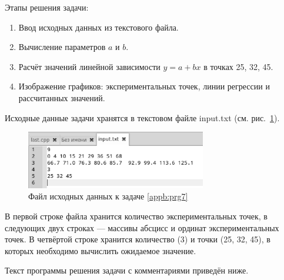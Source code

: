 Этапы решения задачи:

\begin{enumerate}
\item Ввод исходных данных из текстового файла.
\item Вычисление параметров $a$ и $b$.
\item Расчёт значений линейной зависимости  $y=a+bx$ в точках  25, 32, 45.
\item Изображение графиков: экспериментальных точек, линии регрессии и рассчитанных значений.
\end{enumerate}

Исходные данные задачи хранятся в текстовом файле input.txt (см. рис.~\ref{appb:refDrawing8}).

\begin{figure}[htb]
\begin{center}
\includegraphics[width=0.7\textwidth]{img/ris_appb_10}
\caption{Файл исходных данных к задаче \ref{appb:prg7}}
\label{appb:refDrawing8}
\end{center}
\end{figure}

В первой строке файла хранится количество экспериментальных точек, в следующих двух 
строках --- массивы абсцисс и ординат
экспериментальных точек. В четвёртой строке хранится количество (3) и 
точки (25, 32, 45), в которых необходимо
вычислить ожидаемое значение.

Текст программы решения задачи с комментариями приведён ниже.

